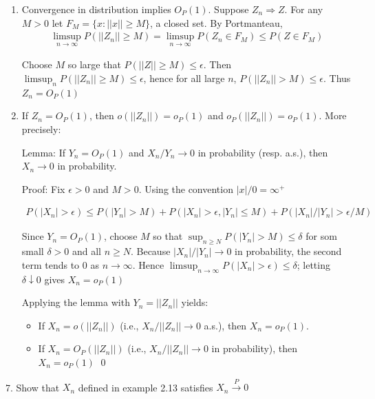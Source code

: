 \documentclass[10pt]{article}
\begin{document}
\begin{enumerate}[label=\textit{(\roman*)}]
    \item Convergence in distribution implies $O_P(1)$. Suppose $Z_n \Rightarrow Z$. For any $M > 0$ let $F_M = \{x : ||x|| \geq M\}$, a closed set. By Portmanteau,
    \begin{gather*}
        \limsup_{n \to \infty} P(||Z_n|| \geq M) = \limsup_{n \to\infty}P(Z_n \in F_M) \leq P(Z \in F_M) 
    \end{gather*}

    Choose $M$ so large that $P(||Z|| \geq M) \leq \epsilon$. Then $\limsup_n P(||Z_n|| \geq M) \leq \epsilon$, hence for all large $n$, $P(||Z_n|| > M) \leq \epsilon$. Thus $Z_n = O_P(1)$
    \item If $Z_n = O_P(1)$, then $o(||Z_n||) = o_P(1)$ and $o_P(||Z_n||) = o_P(1)$. More precisely:
    
    Lemma: If $Y_n = O_P(1)$ and $X_n/Y_n \to 0$ in probability (resp. a.s.), then $X_n \to 0$ in probability.

    Proof: Fix $\epsilon > 0$ and $M > 0$. Using the convention $|x| / 0 = \infty^+$

    \begin{gather*}
        P(|X_n| > \epsilon) \leq P(|Y_n| > M) + P(|X_n| > \epsilon, |Y_n| \leq M) + P(|X_n| / |Y_n| > \epsilon / M)
    \end{gather*}

    Since $Y_n = O_P(1)$, choose $M$ so that $\sup_{n \geq N} P(|Y_n| > M) \leq \delta$ for som small $\delta > 0$ and all $n \geq N$. Because $|X_n| / |Y_n| \to 0$ in probability, the second term tends to 0 as $n \to \infty$. Hence $\limsup_{n \to \infty} P(|X_n| > \epsilon) \leq \delta$; letting $\delta \downarrow 0$ gives $X_n = o_P(1)$

    Applying the lemma with $Y_n = ||Z_n||$ yields:

    \begin{itemize}
        \item If $X_n = o(||Z_n||)$ (i.e., $X_n / ||Z_n|| \to 0$ a.s.), then $X_n = o_P(1)$.
        \item If $X_n = O_P(||Z_n||)$ (i.e., $X_n / ||Z_n|| \to 0$ in probability), then $X_n = o_P(1)$ \qed
    \end{itemize}
\end{enumerate}

\hfill 

7. Show that $X_n$ defined in example 2.13 satisfies $X_n \xrightarrow{P} 0$ 
\end{document}
